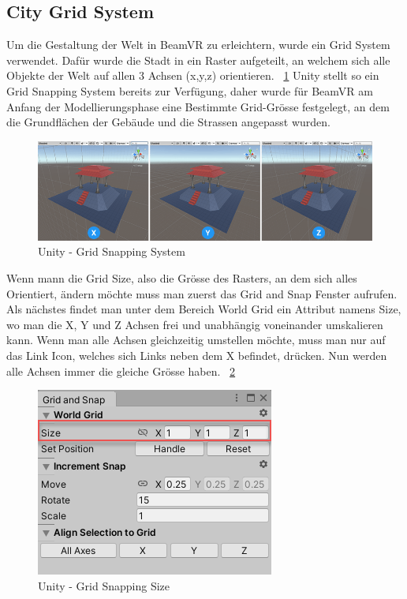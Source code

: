 \subsection{City Grid System}\label{subsec:city-grid-system}
Um die Gestaltung der Welt in BeamVR zu erleichtern, wurde ein Grid System verwendet.
Dafür wurde die Stadt in ein Raster aufgeteilt, an welchem sich alle Objekte der Welt auf allen 3 Achsen (x,y,z) orientieren.
~\ref{fig:grid-system-unity}
Unity stellt so ein Grid Snapping System bereits zur Verf\"ugung, daher wurde f\"ur BeamVR am Anfang der
Modellierungsphase eine Bestimmte Grid-Gr\"osse festgelegt, an dem die Grundfl\"achen der Geb\"aude und die Strassen
angepasst wurden.

\begin {figure}
    \centering
    \includegraphics[scale=0.6]{pics/unity-grid-snapping}
    \caption{Unity - Grid Snapping System}
    \label{fig:grid-system-unity}
\end {figure}

Wenn mann die Grid Size, also die Gr\"osse des Rasters, an dem sich alles Orientiert, \"andern m\"ochte muss man zuerst das Grid and Snap Fenster aufrufen.
Als n\"achstes findet man unter dem Bereich World Grid ein Attribut namens Size, wo man die X, Y und Z Achsen frei und unabh\"angig voneinander umskalieren kann.
Wenn man alle Achsen gleichzeitig umstellen m\"ochte, muss man nur auf das Link Icon, welches sich Links neben dem X befindet, dr\"ucken.
Nun werden alle Achsen immer die gleiche Gr\"osse haben.
~\ref{fig:grid-size-unity}
~\cite{Unity_GridSnapping_2022}

\begin {figure}
    \centering
    \includegraphics{pics/unity-grid-snapping-size}
    \caption{Unity - Grid Snapping Size}
    \label{fig:grid-size-unity}
\end {figure}



